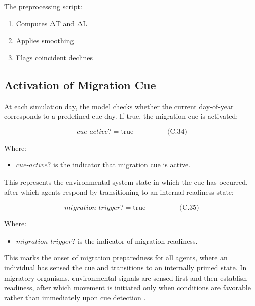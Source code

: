 \documentclass[
]{book}
\providecommand{\tightlist}{%
  \setlength{\itemsep}{0pt}\setlength{\parskip}{0pt}}
\begin{document}
The preprocessing script:

\begin{enumerate}
\def\labelenumi{\arabic{enumi}.}
\tightlist
\item
  Computes ΔT and ΔL
\item
  Applies smoothing
\item
  Flags coincident declines
\end{enumerate}

\subsection{Activation of Migration Cue}\label{activation-of-migration-cue}

At each simulation day, the model checks whether the current day-of-year
corresponds to a predefined cue day. If true, the migration cue is
activated:

\[
\begin{equation} cue\text{-}active? = \text{true}  \hspace{2cm} \text{(C.34)} \end{equation}
\]

Where:

\begin{itemize}
\tightlist
\item
  \(cue\text{-}active?\) is the indicator that migration cue is active.
\end{itemize}

This represents the environmental system state in which the cue has
occurred, after which agents respond by transitioning to an internal
readiness state:

\[
\begin{equation} migration\text{-}trigger? = \text{true}  \hspace{2cm} \text{(C.35)} \end{equation}
\]

Where:

\begin{itemize}
\tightlist
\item
  \(migration\text{-}trigger?\) is the indicator of migration readiness.
\end{itemize}

This marks the onset of migration preparedness for all agents, where an
individual has sensed the cue and transitions to an internally primed
state. In migratory organisms, environmental signals are sensed first
and then establish readiness, after which movement is initiated only
when conditions are favorable rather than immediately upon cue detection
\citep{dingle_2014_migration}.
\end{document}
